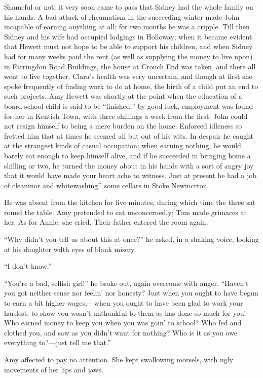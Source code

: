Shameful or not, it very soon came to pass that Sidney had the whole
family on his hands. {}A bad attack of rheumatism in the succeeding
winter made John incapable of earning anything at all; for two months he
was a cripple. Till then Sidney and his wife had occupied lodgings in
Holloway; when it became evident that Hewett must not hope to be able to
support his children, and when Sidney had for many weeks paid the rent
(as well as supplying the money to live npon) in Farringdon Road
Buildings, the house at Crouch End was taken, and there all went to live
together. Clara's health was very uncertain, and though at first she
spoke frequently of finding work to do at home, the birth of a child put
an end to such projects. Amy Hewett was shortly at the point when the
education of a board-school child is said to be ``finished;'' by good
luck, employment was found for her in Kentish Town, with three shillings
a week from the first. John could not resign himself to being a mere
burden on the home. Enforced idleness so fretted him that at times he
seemed all but out of his wits. In despair he caught at the strangest
kinds of casual occupation; when earning nothing, he would barely eat
enough to keep himself alive, and if he succeeded in bringing {}home a
shilling or two, he turned the money about in his hands with a sort of
angry joy that it would have made your heart ache to witness. Just at
present he had a job of cleaninor and whitewashing\^{} some cellars in
Stoke Newincrton.

He was absent from the kitchen for five minutes, during which time the
three sat round the table. Amy pretended to eat unconcernedly; Tom made
grimaces at her. As for Annie, she cried. Their father entered the room
again.

``Why didn't you tell us about this at once?'' he asked, in a shaking
voice, looking at his daughter wdth eyes of blank misery.

``I don't know.''

``You're a bad, selfish girl!'' he broke out, again overcome with anger.
``Haven't you got neither sense nor feelin' nor honesty? Just when you
ought to have begun to earn a bit higher wages,---when you ought to have
been glad to work your hardest, to show you wasn't unthankful to them as
has done so much for you! Who earned money to keep you when you was
goin' to school? Who fed and clothed you, and saw as you didn't want
{}for nothing? Who is it as you owe everything to?---just tell me
that.''

Amy affected to pay no attention. She kept swallowing morsels, with ugly
movements of her lips and jaws.

